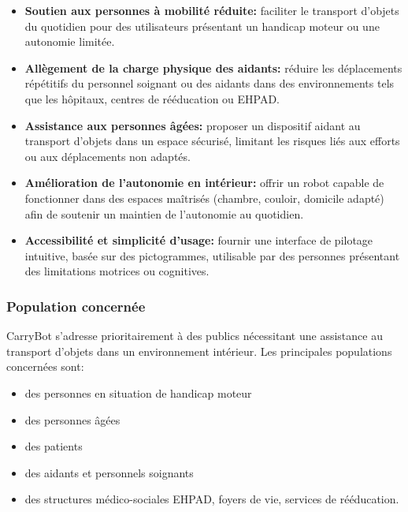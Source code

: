 \documentclass[12pt,a4paper]{article}
\begin{document}
\begin{itemize}
    \item \textbf{Soutien aux personnes à mobilité réduite:} faciliter le transport d’objets du quotidien pour des utilisateurs présentant un handicap moteur ou une autonomie limitée.
    
    \item \textbf{Allègement de la charge physique des aidants:} réduire les déplacements répétitifs du personnel soignant ou des aidants dans des environnements tels que les hôpitaux, centres de rééducation ou EHPAD.
    
    \item \textbf{Assistance aux personnes âgées:} proposer un dispositif aidant au transport d’objets dans un espace sécurisé, limitant les risques liés aux efforts ou aux déplacements non adaptés.
    
    \item \textbf{Amélioration de l’autonomie en intérieur:} offrir un robot capable de fonctionner dans des espaces maîtrisés (chambre, couloir, domicile adapté) afin de soutenir un maintien de l’autonomie au quotidien.
    
    \item \textbf{Accessibilité et simplicité d’usage:} fournir une interface de pilotage intuitive, basée sur des pictogrammes, utilisable par des personnes présentant des limitations motrices ou cognitives.
    
\end{itemize}


\subsubsection{Population concernée}

CarryBot s’adresse prioritairement à des publics nécessitant une assistance au transport d’objets dans un environnement intérieur. Les principales populations concernées sont:

\begin{itemize}
    \item des personnes en situation de handicap moteur
    \item des personnes âgées
    \item des patients
    \item des aidants et personnels soignants
    \item des structures médico-sociales EHPAD, foyers de vie, services de rééducation.
\end{itemize}
\end{document}
